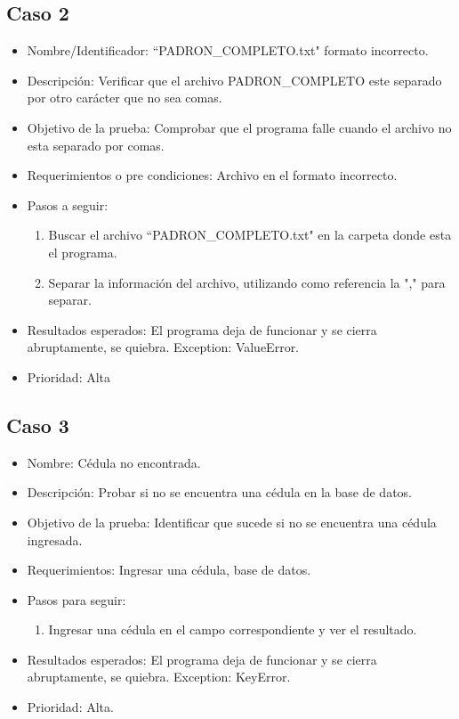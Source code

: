 \documentclass[conference]{IEEEtran}
\begin{document}
\subsection*{Caso 2}
\begin{itemize}
\item Nombre/Identificador: ``PADRON\_COMPLETO.txt" formato incorrecto.
\item Descripción: Verificar que el archivo PADRON\_COMPLETO este separado por otro carácter que no sea comas.
\item Objetivo de la prueba: Comprobar que el programa falle cuando el archivo no esta separado por comas. 
\item Requerimientos o pre condiciones: Archivo en el formato incorrecto.
\item Pasos a seguir: 
\begin{enumerate}
\item Buscar el archivo ``PADRON\_COMPLETO.txt" en la carpeta donde esta el programa.
\item Separar la información del archivo, utilizando como referencia la "," para separar.
\end{enumerate}
\item Resultados esperados: El programa deja de funcionar y se cierra abruptamente, se quiebra. Exception: ValueError.
\item Prioridad: Alta
\end{itemize}



\subsection*{Caso 3}
\begin{itemize}
\item Nombre: Cédula no encontrada.
\item Descripción: Probar si no se encuentra una cédula en la base de datos.
\item Objetivo de la prueba: Identificar que sucede si no se encuentra una cédula ingresada.
\item Requerimientos: Ingresar una cédula, base de datos. 
\item Pasos para seguir: 
\begin{enumerate}
\item Ingresar una cédula en el campo correspondiente y ver el resultado. 
\end{enumerate}
\item Resultados esperados: El programa deja de funcionar y se cierra abruptamente, se quiebra. Exception: KeyError.
\item Prioridad: Alta.

\end{itemize}
\end{document}
